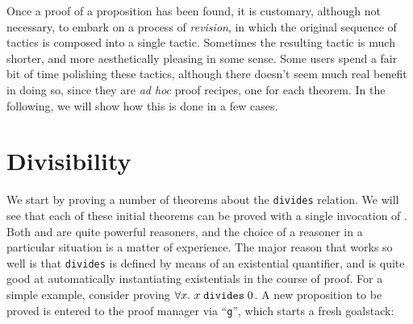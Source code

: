 Once a proof of a proposition has been found, it is customary, although
not necessary, to embark on a process of \emph{revision}, in which the
original sequence of tactics is composed into a single tactic. Sometimes
the resulting tactic is much shorter, and more aesthetically pleasing in
some sense. Some users spend a fair bit of time polishing these tactics,
although there doesn't seem much real benefit in doing so, since they
are \emph{ad hoc} proof recipes, one for each theorem. In the
following, we will show how this is done in a few cases.

\section{Divisibility}

We start by proving a number of theorems about the \verb+divides+
relation.  We will see that each of these initial theorems can be
proved with a single invocation of . Both 
and  are quite powerful reasoners, and the choice of a
reasoner in a particular situation is a matter of experience.  The
major reason that  works so well is that \verb+divides+
is defined by means of an existential quantifier, and 
is quite good at automatically instantiating existentials in the
course of proof. For a simple example, consider proving $\forall x.\
x\; \mbox{\tt divides}\; 0$. A new proposition to be proved is entered
to the proof manager via ``{\tt g}'', which starts a fresh goalstack:

